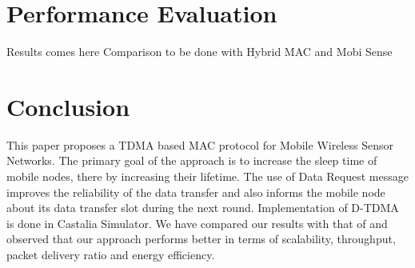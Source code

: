 \documentclass[a4paper, conference, 10pt]{IEEEtran}
\begin{document}

\section{Performance Evaluation}         
\label{sim}


Results comes here
Comparison to be done with Hybrid MAC and Mobi Sense

\section{Conclusion}
\label{conclusion}
This paper proposes a TDMA based MAC protocol for Mobile Wireless Sensor Networks. The primary goal of the approach is to increase the sleep time of mobile nodes, there by increasing their lifetime. The use of Data Request message improves the reliability of the data transfer and also informs the mobile node about its data transfer slot during the next round. Implementation of D-TDMA is done in Castalia Simulator. We have compared our results with that of \cite{hmac} and observed that our approach performs better in terms of scalability, throughput, packet delivery ratio and energy efficiency.



\end{document}
